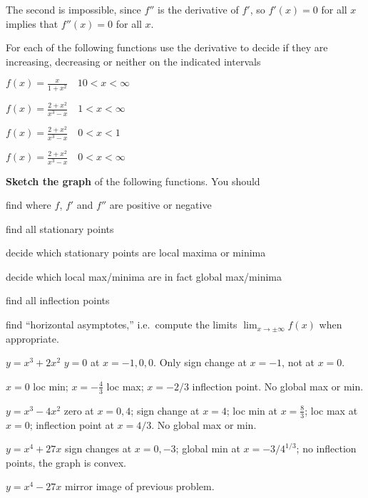 \begin{multicols}{2}
The second is impossible, since $f''$ is the derivative of
$f'$, so $f'(x) = 0$ for all $x$ implies that
$f''(x)=0$ for all $x$.
\endanswer


\bigskip

For each of the following functions use the derivative to decide if they are
increasing, decreasing or neither on the indicated intervals

\problem $\displaystyle f(x) = \frac{x}{1+x^2}  \quad10<x<\infty$

\problem $\displaystyle f(x) = \frac{2+x^2}{x^3-x}	  \quad1<x<\infty$

\problem $\displaystyle f(x) = \frac{2+x^2}{x^3-x}	  \quad0<x<1$

\problem $\displaystyle f(x) = \frac{2+x^2}{x^3-x}	  \quad0<x<\infty$

\bigskip

\textbf{Sketch the graph} of the following functions.
You should
\begin{list}{--}{
    \setlength{\itemindent}{0pt}
    \setlength{\leftmargin}{6pt}}
\item find where $f$, $f'$ and $f''$ are positive or negative
\item find all stationary points
\item decide which stationary points are local maxima or minima
\item decide which local max/minima are in fact global max/minima
\item find all inflection points
\item find ``horizontal asymptotes,'' i.e.\ compute the limits
  $\lim_{x\to\pm\infty}f(x)$ when appropriate.
\end{list}




\problem $\displaystyle y=x^3+2x^2 $
\answer
$y=0$ at $x=-1, 0, 0$.  Only sign change at $x=-1$, not at $x=0$.

$x=0$ loc min;  $x=-\frac43$ loc max;  $x=-2/3$ inflection point.
No global max or min.
\endanswer

\problem $\displaystyle y=x^3-4x^2$
\answer
zero at $x=0, 4$; sign change at $x=4$; loc min at $x=\frac83$; loc
max at $x=0$; inflection point at $x=4/3$.  No global max or min.
\endanswer

\problem $\displaystyle y=x^4+27x $
\answer
sign changes at $x=0, -3$;  global min at $x=-3/4^{1/3}$; no inflection
points, the graph is convex.
\endanswer

\problem $\displaystyle y=x^4-27x$
\answer
mirror image of previous problem.
\endanswer


\end{multicols}
